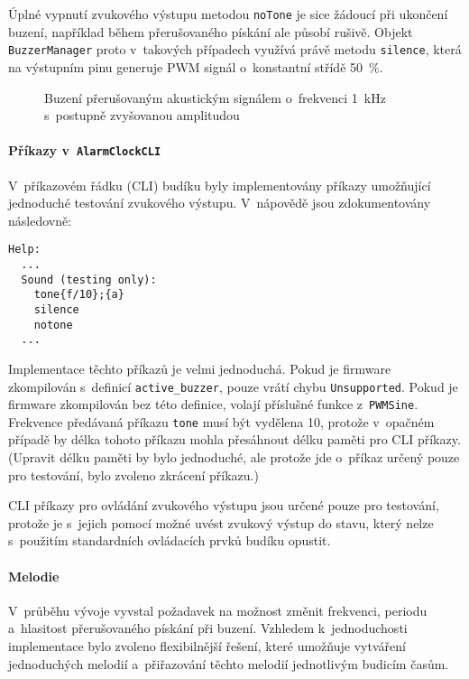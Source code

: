 Úplné vypnutí zvukového výstupu metodou \texttt{noTone} je sice žádoucí při
ukončení buzení, například během přerušovaného pískání ale působí rušivě.
Objekt \texttt{BuzzerManager} proto v~takových případech využívá právě metodu
\texttt{silence}, která na výstupním pinu generuje PWM signál o~konstantní
střídě \SI{50}{\percent}.

\begin{figure}[htbp]
    \centering
    \caption{%
        Buzení přerušovaným akustickým signálem o~frekvenci \SI{1}{\kilo\hertz}
        s~postupně zvyšovanou amplitudou
    }
    \label{fig:zvuk sine ramp}
\end{figure}


\paragraph{Příkazy v~\texttt{AlarmClockCLI}}
V~příkazovém řádku (CLI) budíku byly implementovány příkazy umožňující
jednoduché testování zvukového výstupu. V~nápovědě jsou zdokumentovány
následovně:
\begin{lstlisting}[style=terminal]
Help:
  ...
  Sound (testing only):
    tone{f/10};{a}
    silence
    notone
  ...
\end{lstlisting}

Implementace těchto příkazů je velmi jednoduchá. Pokud je firmware zkompilován
s~definicí \verb|active_buzzer|, pouze vrátí chybu \verb|Unsupported|. Pokud je
firmware zkompilován bez této definice, volají příslušné funkce
z~\verb|PWMSine|. Frekvence předávaná příkazu \verb|tone| musí být vydělena 10,
protože v~opačném případě by délka tohoto příkazu mohla přesáhnout délku paměti
pro CLI příkazy. (Upravit délku paměti by bylo jednoduché, ale protože jde
o~příkaz určený pouze pro testování, bylo zvoleno zkrácení příkazu.)

CLI příkazy pro ovládání zvukového výstupu jsou určené pouze pro testování,
protože je s~jejich pomocí možné uvést zvukový výstup do stavu, který nelze
s~použitím standardních ovládacích prvků budíku opustit.



\paragraph{Melodie}
V~průběhu vývoje vyvstal požadavek na možnost změnit frekvenci, periodu
a~hlasitost přerušovaného pískání při buzení. Vzhledem k~jednoduchosti
implementace bylo zvoleno flexibilnější řešení, které umožňuje vytváření
jednoduchých melodií a~přiřazování těchto melodií jednotlivým budicím časům.

